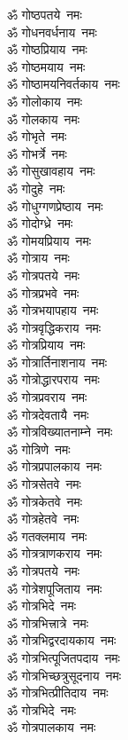 \begin{multicols}{2}
\begin{flushleft}
ॐ गोष्ठपतये~नमः\\
ॐ गोधनवर्धनाय~नमः\\
ॐ गोष्ठप्रियाय~नमः\\
ॐ गोष्ठमयाय~नमः\\
ॐ गोष्ठामयनिवर्तकाय~नमः\\
ॐ गोलोकाय~नमः\\
ॐ गोलकाय~नमः\\
ॐ गोभृते~नमः\\
ॐ गोभर्त्रे~नमः\hfill{}\\
ॐ गोसुखावहाय~नमः\\
ॐ गोदुहे~नमः\\
ॐ गोधुग्गणप्रेष्ठाय~नमः\\
ॐ गोदोग्ध्रे~नमः\\
ॐ गोमयप्रियाय~नमः\\
ॐ गोत्राय~नमः\\
ॐ गोत्रपतये~नमः\\
ॐ गोत्रप्रभवे~नमः\\
ॐ गोत्रभयापहाय~नमः\\
ॐ गोत्रवृद्धिकराय~नमः\hfill{}\\
ॐ गोत्रप्रियाय~नमः\\
ॐ गोत्रार्तिनाशनाय~नमः\\
ॐ गोत्रोद्धारपराय~नमः\\
ॐ गोत्रप्रवराय~नमः\\
ॐ गोत्रदेवतायै~नमः\\
ॐ गोत्रविख्यातनाम्ने~नमः\\
ॐ गोत्रिणे~नमः\\
ॐ गोत्रप्रपालकाय~नमः\\
ॐ गोत्रसेतवे~नमः\\
ॐ गोत्रकेतवे~नमः\hfill{}\\
ॐ गोत्रहेतवे~नमः\\
ॐ गतक्लमाय~नमः\\
ॐ गोत्रत्राणकराय~नमः\\
ॐ गोत्रपतये~नमः\\
ॐ गोत्रेशपूजिताय~नमः\\
ॐ गोत्रभिदे~नमः\\
ॐ गोत्रभित्त्रात्रे~नमः\\
ॐ गोत्रभिद्वरदायकाय~नमः\\
ॐ गोत्रभित्पूजितपदाय~नमः\\
ॐ गोत्रभिच्छत्रुसूदनाय~नमः\hfill{}\\
ॐ गोत्रभित्प्रीतिदाय~नमः\\
ॐ गोत्रभिदे~नमः\\
ॐ गोत्रपालकाय~नमः\\

\end{flushleft}
\end{multicols}
